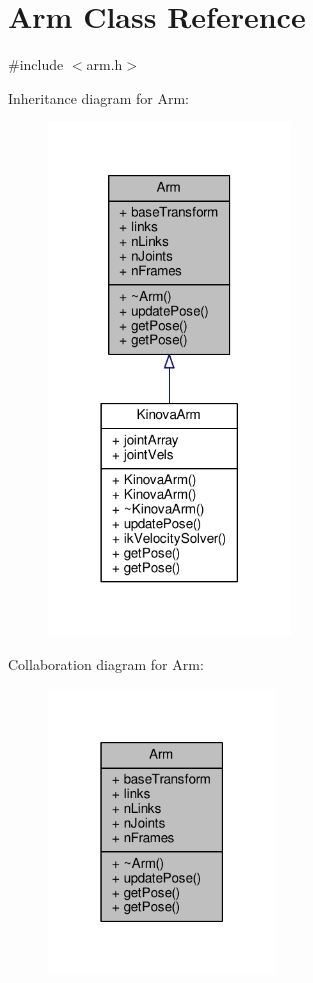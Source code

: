 \hypertarget{class_arm}{}\section{Arm Class Reference}
\label{class_arm}


{\ttfamily \#include $<$arm.\+h$>$}



Inheritance diagram for Arm\+:\nopagebreak
\begin{figure}[H]
\begin{center}
\leavevmode
\includegraphics[width=182pt]{class_arm__inherit__graph}
\end{center}
\end{figure}


Collaboration diagram for Arm\+:\nopagebreak
\begin{figure}[H]
\begin{center}
\leavevmode
\includegraphics[width=171pt]{class_arm__coll__graph}
\end{center}
\end{figure}
